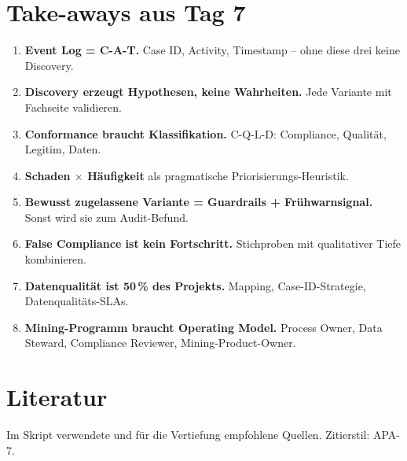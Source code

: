 \documentclass[11pt,a4paper,oneside]{article}
\begin{document}
\section{Take-aways aus Tag 7}

\begin{enumerate}
  \item \textbf{Event Log = C-A-T.} Case ID, Activity, Timestamp -- ohne diese drei keine Discovery.
  \item \textbf{Discovery erzeugt Hypothesen, keine Wahrheiten.} Jede Variante mit Fachseite validieren.
  \item \textbf{Conformance braucht Klassifikation.} C-Q-L-D: Compliance, Qualität, Legitim, Daten.
  \item \textbf{Schaden $\times$ Häufigkeit} als pragmatische Priorisierungs-Heuristik.
  \item \textbf{Bewusst zugelassene Variante = Guardrails + Frühwarnsignal.} Sonst wird sie zum Audit-Befund.
  \item \textbf{False Compliance ist kein Fortschritt.} Stichproben mit qualitativer Tiefe kombinieren.
  \item \textbf{Datenqualität ist 50\,\% des Projekts.} Mapping, Case-ID-Strategie, Datenqualitäts-SLAs.
  \item \textbf{Mining-Programm braucht Operating Model.} Process Owner, Data Steward, Compliance Reviewer, Mining-Product-Owner.
\end{enumerate}

\clearpage
\section{Literatur}

Im Skript verwendete und für die Vertiefung empfohlene Quellen. Zitierstil: APA-7.
\end{document}
